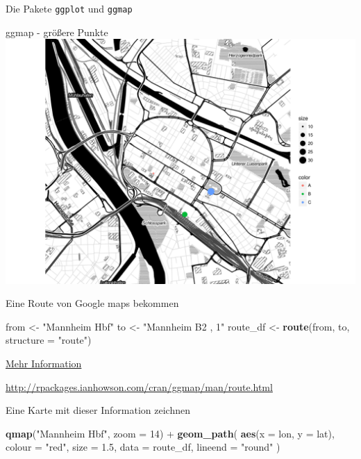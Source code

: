 \documentclass[ignorenonframetext,]{beamer}
\newenvironment{Shaded}{}{}
\newcommand{\KeywordTok}[1]{\textcolor[rgb]{0.00,0.44,0.13}{\textbf{{#1}}}}
\newcommand{\DataTypeTok}[1]{\textcolor[rgb]{0.56,0.13,0.00}{{#1}}}
\newcommand{\DecValTok}[1]{\textcolor[rgb]{0.25,0.63,0.44}{{#1}}}
\newcommand{\FloatTok}[1]{\textcolor[rgb]{0.25,0.63,0.44}{{#1}}}
\newcommand{\StringTok}[1]{\textcolor[rgb]{0.25,0.44,0.63}{{#1}}}
\newcommand{\NormalTok}[1]{{#1}}
\begin{document}
\begin{frame}[fragile]{Die Pakete \texttt{ggplot} und \texttt{ggmap}}
\begin{block}{ggmap - größere Punkte}
\includegraphics{R_intern_files/figure-beamer/unnamed-chunk-283-1.pdf}

\end{block}

\begin{block}{Eine Route von Google maps bekommen}

\begin{Shaded}
\begin{Highlighting}[]
\NormalTok{from <-}\StringTok{ "Mannheim Hbf"}
\NormalTok{to <-}\StringTok{ "Mannheim B2 , 1"}
\NormalTok{route_df <-}\StringTok{ }\KeywordTok{route}\NormalTok{(from, to, }\DataTypeTok{structure =} \StringTok{"route"}\NormalTok{)}
\end{Highlighting}
\end{Shaded}

\href{http://rpackages.ianhowson.com/cran/ggmap/man/route.html}{Mehr
Information}

\url{http://rpackages.ianhowson.com/cran/ggmap/man/route.html}

\end{block}

\begin{block}{Eine Karte mit dieser Information zeichnen}

\begin{Shaded}
\begin{Highlighting}[]
\KeywordTok{qmap}\NormalTok{(}\StringTok{"Mannheim Hbf"}\NormalTok{, }\DataTypeTok{zoom =} \DecValTok{14}\NormalTok{) +}
\StringTok{  }\KeywordTok{geom_path}\NormalTok{(}
    \KeywordTok{aes}\NormalTok{(}\DataTypeTok{x =} \NormalTok{lon, }\DataTypeTok{y =} \NormalTok{lat),  }\DataTypeTok{colour =} \StringTok{"red"}\NormalTok{, }\DataTypeTok{size =} \FloatTok{1.5}\NormalTok{,}
    \DataTypeTok{data =} \NormalTok{route_df, }\DataTypeTok{lineend =} \StringTok{"round"}
  \NormalTok{)}
\end{Highlighting}
\end{Shaded}


\end{block}
\end{frame}
\end{document}
